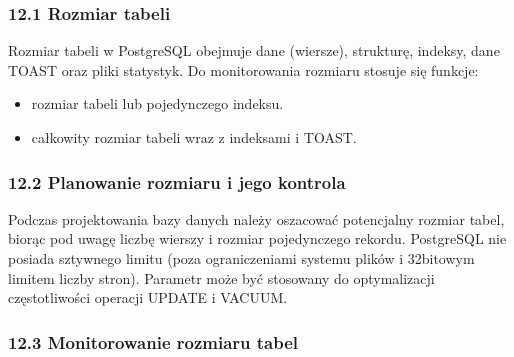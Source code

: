 \documentclass[a4paper,11pt,openany,english]{sphinxmanual}
\begin{document}
\subsubsection{12.1 Rozmiar tabeli}
\label{\detokenize{rozdzial2/Konfiguracja_baz_danych/Konfiguracja_baz_danych:rozmiar-tabeli}}
\sphinxAtStartPar
Rozmiar tabeli w PostgreSQL obejmuje dane (wiersze), strukturę, indeksy, dane TOAST oraz pliki statystyk. Do monitorowania rozmiaru stosuje się funkcje:
\begin{itemize}
\item {} 
\sphinxAtStartPar
{} \textendash{} rozmiar tabeli lub pojedynczego indeksu.

\item {} 
\sphinxAtStartPar
{} \textendash{} całkowity rozmiar tabeli wraz z indeksami i TOAST.

\end{itemize}


\subsubsection{12.2 Planowanie rozmiaru i jego kontrola}
\label{\detokenize{rozdzial2/Konfiguracja_baz_danych/Konfiguracja_baz_danych:planowanie-rozmiaru-i-jego-kontrola}}
\sphinxAtStartPar
Podczas projektowania bazy danych należy oszacować potencjalny rozmiar tabel, biorąc pod uwagę liczbę wierszy i rozmiar pojedynczego rekordu. PostgreSQL nie posiada sztywnego limitu (poza ograniczeniami systemu plików i 32\sphinxhyphen{}bitowym limitem liczby stron). Parametr  może być stosowany do optymalizacji częstotliwości operacji UPDATE i VACUUM.


\subsubsection{12.3 Monitorowanie rozmiaru tabel}
\label{\detokenize{rozdzial2/Konfiguracja_baz_danych/Konfiguracja_baz_danych:monitorowanie-rozmiaru-tabel}}
\sphinxAtStartPar
{}

\begin{sphinxVerbatim}[commandchars=\\\{\}]
 
\end{sphinxVerbatim}
\end{document}
